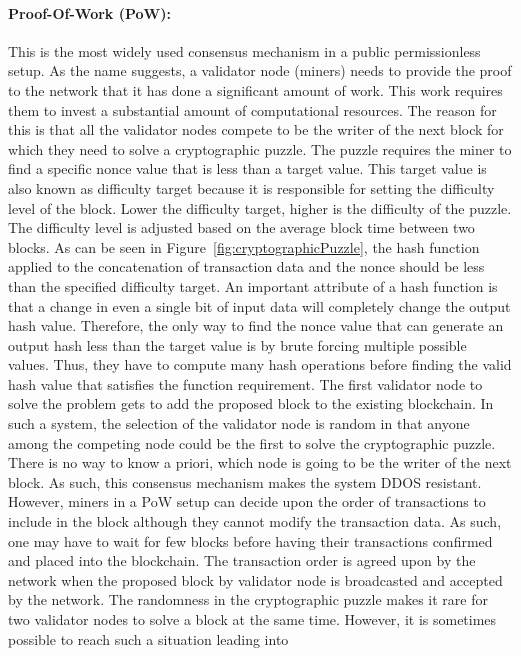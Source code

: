 \paragraph{Proof-Of-Work (PoW):}This is the most widely used consensus
mechanism in a public permissionless setup. As the name suggests, a validator
node (miners) needs to provide the proof to the network that it has done a
significant amount of work. This work requires them to invest a substantial
amount of computational resources. The reason for this is that all the
validator nodes compete to be the writer of the next block for which they need
to solve a cryptographic puzzle. The puzzle requires the miner to find a
specific nonce value that is less than a target value. This target value is
also known as difficulty target because it is responsible for setting the
difficulty level of the block. Lower the difficulty target, higher is the
difficulty of the puzzle. The difficulty level is adjusted based on the average
block time between two blocks. As can be seen in
Figure~\ref{fig:cryptographicPuzzle}, the hash function applied to the
concatenation of transaction data and the nonce should be less than the
specified difficulty target. An important attribute of a hash function is that
a change in even a single bit of input data will completely change the output
hash value. Therefore, the only way to find the nonce value that can generate
an output hash less than the target value is by brute forcing multiple possible
values. Thus, they have to compute many hash operations before finding the
valid hash value that satisfies the function requirement. The first validator
node to solve the problem gets to add the proposed block to the existing
blockchain. In such a system, the selection of the validator node is random in
that anyone among the competing node could be the first to solve the
cryptographic puzzle. There is no way to know a priori, which node is going to
be the writer of the next block. As such, this consensus mechanism makes the
system DDOS resistant. However, miners in a PoW setup can decide upon the order
of transactions to include in the block although they cannot modify the
transaction data. As such, one may have to wait for few blocks before having
their transactions confirmed and placed into the blockchain. The transaction
order is agreed upon by the network when the proposed block by validator node
is broadcasted and accepted by the network. The randomness in the cryptographic
puzzle makes it rare for two validator nodes to solve a block at the same time.
However, it is sometimes possible to reach such a situation leading into
